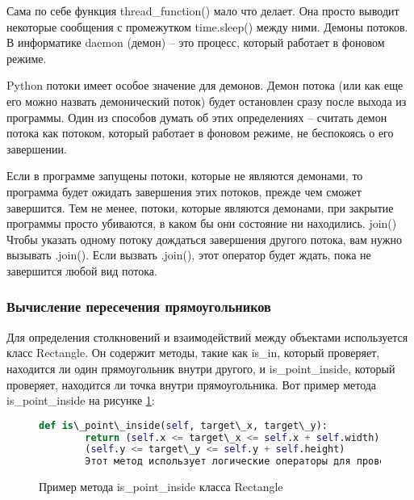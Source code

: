 Сама по себе функция thread\_function() мало что делает. Она просто выводит некоторые сообщения с промежутком time.sleep() между ними.
Демоны потоков.
В информатике daemon (демон) – это процесс, который работает в фоновом режиме.

Python потоки имеет особое значение для демонов. Демон потока (или как еще его можно назвать демонический поток) будет остановлен сразу после выхода из программы. Один из способов думать об этих определениях – считать демон потока как потоком, который работает в фоновом режиме, не беспокоясь о его завершении.

Если в программе запущены потоки, которые не являются демонами, то программа будет ожидать завершения этих потоков, прежде чем сможет завершится. Тем не менее, потоки, которые являются демонами, при закрытие программы просто убиваются, в каком бы они состояние ни находились.
join()
Чтобы указать одному потоку дождаться завершения другого потока, вам нужно вызывать .join().  Если вызвать .join(), этот оператор будет ждать, пока не завершится любой вид потока.
\subsubsection{Вычисление пересечения прямоугольников}
Для определения столкновений и взаимодействий между объектами используется класс Rectangle. Он содержит методы, такие как is\_in, который проверяет, находится ли один прямоугольник внутри другого, и is\_point\_inside, который проверяет, находится ли точка внутри прямоугольника. Вот пример метода is\_point\_inside на рисунке \ref{tttk:image}:
\begin{figure}[H]
	\begin{lstlisting}[language=Python]
		def is\_point\_inside(self, target\_x, target\_y):
		return (self.x <= target\_x <= self.x + self.width) and
		(self.y <= target\_y <= self.y + self.height)
		Этот метод использует логические операторы для проверки, находится ли точка (target\_x, target\_y) в пределах прямоугольника, определенного координатами (x, y) и размерами (width, height).
\end{lstlisting}  
\caption{Пример метода is\_point\_inside класса Rectangle}
\label{tttk:image}
\end{figure}

